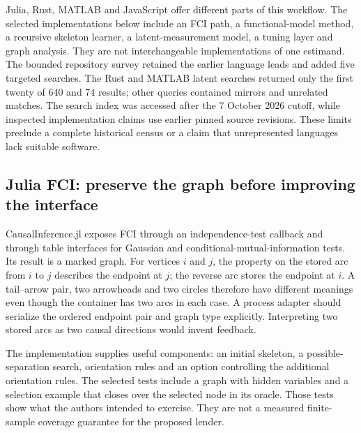 Julia, Rust, MATLAB and JavaScript offer different parts of this
workflow. The selected implementations below include an FCI path, a
functional-model method, a recursive skeleton learner, a
latent-measurement model, a tuning layer and graph analysis. They are
not interchangeable implementations of one estimand. The bounded
repository survey retained the earlier language leads and added five
targeted searches. The Rust and MATLAB latent searches returned only the
first twenty of 640 and 74 results; other queries contained mirrors and
unrelated matches. The search index was accessed after the 7 October
2026 cutoff, while inspected implementation claims use earlier pinned
source revisions. These limits preclude a complete historical census or
a claim that unrepresented languages lack suitable software.
\citep{exec14_olatent_search}

\hypertarget{julia-fci-preserve-the-graph-before-improving-the-interface}{%
\subsection{Julia FCI: preserve the graph before improving the
interface}\label{julia-fci-preserve-the-graph-before-improving-the-interface}}

CausalInference.jl exposes FCI through an independence-test callback and
through table interfaces for Gaussian and conditional-mutual-information
tests. Its result is a marked graph. For vertices \(i\) and \(j\), the
property on the stored arc from \(i\) to \(j\) describes the endpoint at
\(j\); the reverse arc stores the endpoint at \(i\). A tail--arrow pair,
two arrowheads and two circles therefore have different meanings even
though the container has two arcs in each case. A process adapter should
serialize the ordered endpoint pair and graph type explicitly.
Interpreting two stored arcs as two causal directions would invent
feedback. \citep{exec14_olatent_causalinference}

The implementation supplies useful components: an initial skeleton, a
possible-separation search, orientation rules and an option controlling
the additional orientation rules. The selected tests include a graph
with hidden variables and a selection example that closes over the
selected node in its oracle. Those tests show what the authors intended
to exercise. They are not a measured finite-sample coverage guarantee
for the proposed lender. \citep{exec14_olatent_causalinference}

